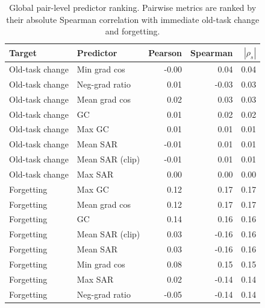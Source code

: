 \documentclass{article}
\begin{document}
\begin{table}[!htbp]
  \centering
  \caption{
  {Global pair-level predictor ranking.}
  Pairwise metrics are ranked by their absolute Spearman correlation with immediate old-task change and forgetting.
  }
  \label{tab:app_pair_explanation_global}
  \scriptsize
  \setlength{\tabcolsep}{4pt}
{
\renewcommand{\arraystretch}{1.06}
\begin{tabular}{llrrr}
\toprule[0.9pt]
\rowcolor{sizeBand}
Target & Predictor & Pearson & Spearman & $|\rho_s|$ \\
\midrule
\rowcolor{mergeBlue} Old-task change & Min grad cos & -0.00 & 0.04 & 0.04 \\
\rowcolor{mergeBlue} Old-task change & Neg-grad ratio & 0.01 & -0.03 & 0.03 \\
\rowcolor{mergeBlue} Old-task change & Mean grad cos & 0.02 & 0.03 & 0.03 \\
\rowcolor{mergeBlue} Old-task change & GC & 0.01 & 0.02 & 0.02 \\
\rowcolor{mergeBlue} Old-task change & Max GC & 0.01 & 0.01 & 0.01 \\
\rowcolor{mergeBlue} Old-task change & Mean SAR & -0.01 & 0.01 & 0.01 \\
\rowcolor{mergeBlue} Old-task change & Mean SAR (clip) & -0.01 & 0.01 & 0.01 \\
\rowcolor{mergeBlue} Old-task change & Max SAR & 0.00 & 0.00 & 0.00 \\
\midrule
\rowcolor{rcwmBlue} Forgetting & Max GC & 0.12 & 0.17 & 0.17 \\
\rowcolor{rcwmBlue} Forgetting & Mean grad cos & 0.12 & 0.17 & 0.17 \\
\rowcolor{rcwmBlue} Forgetting & GC & 0.14 & 0.16 & 0.16 \\
\rowcolor{rcwmBlue} Forgetting & Mean SAR (clip) & 0.03 & -0.16 & 0.16 \\
\rowcolor{rcwmBlue} Forgetting & Mean SAR & 0.03 & -0.16 & 0.16 \\
\rowcolor{rcwmBlue} Forgetting & Min grad cos & 0.08 & 0.15 & 0.15 \\
\rowcolor{rcwmBlue} Forgetting & Max SAR & 0.02 & -0.14 & 0.14 \\
\rowcolor{rcwmBlue} Forgetting & Neg-grad ratio & -0.05 & -0.14 & 0.14 \\
\bottomrule[0.9pt]
\end{tabular}
}

\end{table}
\end{document}
